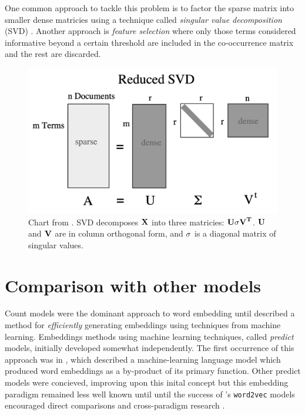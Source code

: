 One common approach to tackle this problem is to factor the sparse matrix into smaller dense matricies using a technique called \emph{singular value decomposition} (SVD) \parencite{dumais-1988-using-lsa-to-improve}. Another approach is \emph{feature selection} where only those terms considered informative beyond a certain threshold are included in the co-occurrence matrix and the rest are discarded.

\begin{figure}[H]
  \centering
  \captionsetup{width=.91\linewidth}
  \includegraphics[scale=0.35]{figures/reduced-svd.png}
  \caption{Chart from \textcite{albright-2004-taming}. SVD decomposes $\bf{X}$ into three matricies: $\bf{U\sigma V}^T$. $\bf{U}$ and $\bf{V}$ are in column orthogonal form, and $\bf{\sigma}$ is a diagonal matrix of singular values. \parencite{golub13_matrix, turney10-from-frequen-to-meanin}}\label{fig:svd}
\end{figure}

\section{Comparison with other models}
Count models were the dominant approach to word embedding until \textcite{mikolov13-effic-estim-word-repres-vector-space} described a method for \emph{efficiently} generating embeddings using techniques from machine learning. Embeddings methods using machine learning techniques, called \emph{predict} models, initially developed somewhat independently. The first occurrence of this approach was in \parencite{bengio-2003-a-neural-prob-lang-model}, which described a machine-learning language model which produced word embeddings as a by-product of its primary function. Other predict models were concieved, improving upon this inital concept \parencite{morin-2005-hierarchical-probabilistic, mnih-2007-three-new-graphical-models, collobert-2008-a-unified-architecture} but this embedding paradigm remained less well known until until the success of \citeauthor{mikolov13-effic-estim-word-repres-vector-space}'s \parencite*{mikolov13-effic-estim-word-repres-vector-space} \texttt{word2vec} models encouraged direct comparisons and cross-paradigm research \parencite{baroni-etal-2014-dont, levy-2014-neural-WE-as}.

